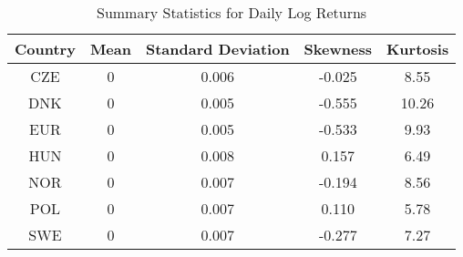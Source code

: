 \begin{table}[!h]
\centering
\caption{Summary Statistics for Daily Log Returns}
\centering
\begin{tabular}[t]{ccccc}
\toprule
Country & Mean & Standard Deviation & Skewness & Kurtosis\\
\midrule
CZE & 0 & 0.006 & -0.025 & 8.55\\
DNK & 0 & 0.005 & -0.555 & 10.26\\
EUR & 0 & 0.005 & -0.533 & 9.93\\
HUN & 0 & 0.008 & 0.157 & 6.49\\
NOR & 0 & 0.007 & -0.194 & 8.56\\
\addlinespace
POL & 0 & 0.007 & 0.110 & 5.78\\
SWE & 0 & 0.007 & -0.277 & 7.27\\
\bottomrule
\end{tabular}
\end{table}
